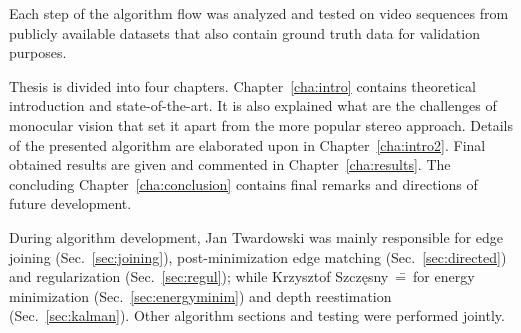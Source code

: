 Each step of the algorithm flow was analyzed and tested on video sequences from publicly available datasets that also contain ground truth data for validation purposes.

Thesis is divided into four chapters. Chapter~\ref{cha:intro} contains theoretical introduction and state-of-the-art. It is also explained what are the challenges of monocular vision that set it apart from the more popular stereo approach. Details of the presented algorithm are elaborated upon in Chapter~\ref{cha:intro2}. Final obtained results are given and commented in Chapter~\ref{cha:results}. The concluding Chapter~\ref{cha:conclusion} contains final remarks and directions of future development.

During algorithm development, Jan Twardowski was mainly responsible for edge joining (Sec.~\ref{sec:joining}), post-minimization edge matching (Sec.~\ref{sec:directed}) and regularization (Sec.~\ref{sec:regul}); while Krzysztof Szcz\k{e}sny~\==~for energy minimization (Sec.~\ref{sec:energyminim}) and depth reestimation (Sec.~\ref{sec:kalman}). Other algorithm sections and testing were performed jointly. 














\clearpage 